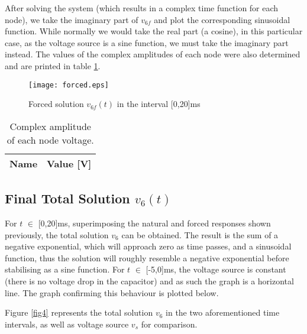 After solving the system (which results in a complex time function for each node), we take the imaginary part of $v_{6f}$ and plot the corresponding sinusoidal function. While normally we would take the real part (a cosine), in this particular case, as the voltage source is a sine function, we must take the imaginary part instead. The values of the complex amplitudes of each node were also determined and are printed in table \ref{tab4}.

\begin{figure}[!htp] \centering
\texttt{[image: forced.eps]}
\caption{Forced solution $v_{6f}(t)$ in the interval [0,20]ms}
\label{fig3}
\end{figure}
\FloatBarrier

\begin{table}[h]                             
\centering                                  %
\def\arraystretch{1.2}                       %
\begin{tabular}{c|c}                    %
\hline                                  %

\textbf{Name}  & \textbf{Value [V]}\\     

\hline                                %

\hline                                %
\end{tabular}   

\caption{Complex amplitude of each node voltage.}
\label{tab4}   
\end{table}                             
\FloatBarrier

\subsection{Final Total Solution $v_6(t)$}\label{sec2.5}

For $t$ $\in$ [0,20]ms, superimposing the natural and forced responses shown previously, the total solution $v_6$ can be obtained. The result is the sum of a negative exponential, which will approach zero as time passes, and a sinusoidal function, thus the solution will roughly resemble a negative exponential before stabilising as a sine function.  For $t$ $\in$ [-5,0]ms, the voltage source is constant (there is no voltage drop in the capacitor) and as such the graph is a horizontal line. The graph confirming this behaviour is plotted below.

Figure \ref{fig4} represents the total solution $v_6$ in the two aforementioned time intervals, as well as voltage source $v_s$ for comparison.

